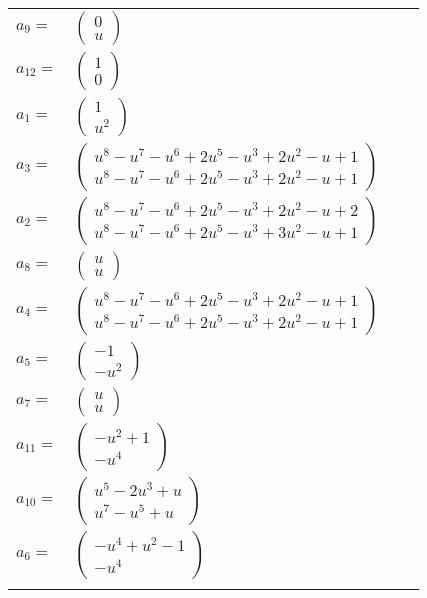\documentclass[1p]{elsarticle_modified}
\theoremstyle{definition}
\begin{document}
\begin{tabular}{m{7pt} m{180pt} m{7pt} m{180pt} }
\flushright $a_{9}=$&$\begin{pmatrix}0\\u\end{pmatrix}$ \\
\flushright $a_{12}=$&$\begin{pmatrix}1\\0\end{pmatrix}$ \\
\flushright $a_{1}=$&$\begin{pmatrix}1\\u^2\end{pmatrix}$ \\
\flushright $a_{3}=$&$\begin{pmatrix}u^8- u^7- u^6+2 u^5- u^3+2 u^2- u+1\\u^8- u^7- u^6+2 u^5- u^3+2 u^2- u+1\end{pmatrix}$ \\
\flushright $a_{2}=$&$\begin{pmatrix}u^8- u^7- u^6+2 u^5- u^3+2 u^2- u+2\\u^8- u^7- u^6+2 u^5- u^3+3 u^2- u+1\end{pmatrix}$ \\
\flushright $a_{8}=$&$\begin{pmatrix}u\\u\end{pmatrix}$ \\
\flushright $a_{4}=$&$\begin{pmatrix}u^8- u^7- u^6+2 u^5- u^3+2 u^2- u+1\\u^8- u^7- u^6+2 u^5- u^3+2 u^2- u+1\end{pmatrix}$ \\
\flushright $a_{5}=$&$\begin{pmatrix}-1\\- u^2\end{pmatrix}$ \\
\flushright $a_{7}=$&$\begin{pmatrix}u\\u\end{pmatrix}$ \\
\flushright $a_{11}=$&$\begin{pmatrix}- u^2+1\\- u^4\end{pmatrix}$ \\
\flushright $a_{10}=$&$\begin{pmatrix}u^5-2 u^3+u\\u^7- u^5+u\end{pmatrix}$ \\
\flushright $a_{6}=$&$\begin{pmatrix}- u^4+u^2-1\\- u^4\end{pmatrix}$\\&\end{tabular}
\end{document}
